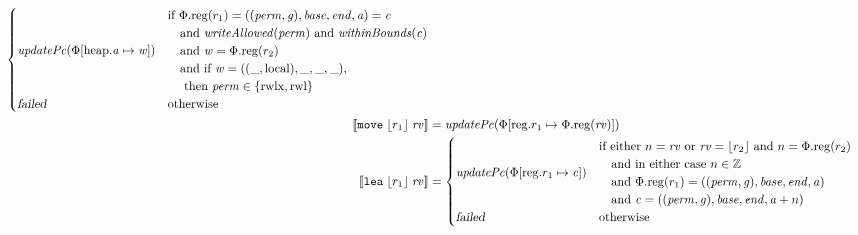 \documentclass{article}
\newcommand{\update}[2]{[#1 \mapsto #2]}
\newcommand{\sem}[1]{\left\llbracket #1 \right\rrbracket}
\newcommand{\var}[1]{\mathit{#1}}
\newcommand{\rv}{\var{rv}}
\newcommand{\gl}{\var{g}}
\newcommand{\addr}{\var{a}}
\newcommand{\start}{\var{base}}
\newcommand{\addrend}{\var{end}}
\newcommand{\perm}{\var{perm}}
\newcommand{\stdcap}[1][(\perm,\gl)]{\left(#1,\start,\addrend,\addr \right)}
\newcommand{\plainproj}[1]{\mathrm{#1}}
\newcommand{\memreg}[1][\Phi]{#1.\plainproj{reg}}
\newcommand{\updateHeap}[3][\Phi]{#1\update{\plainproj{heap}.#2}{#3}}
\newcommand{\updateReg}[3][\Phi]{#1\update{\plainproj{reg}.#2}{#3}}
\newcommand{\failed}{\textsl{failed}}
\newcommand{\plainfun}[2]{
  \ifthenelse{\equal{#2}{}}
             {\mathit{#1}}
             {\mathit{#1}(#2)}
}
\newcommand{\writeAllowed}[1]{\plainfun{writeAllowed}{#1}}
\newcommand{\withinBounds}[1]{\plainfun{withinBounds}{#1}}
\newcommand{\stdUpdatePc}[1]{\plainfun{updatePc}{#1}}
\newcommand{\ints}{\mathbb{Z}}
\newcommand{\refreg}[1]{\lfloor #1 \rfloor}
\newcommand{\zinstr}[1]{\mathtt{#1}}
\newcommand{\twoinstr}[3]{\zinstr{#1} \; #2 \; #3}
\newcommand{\move}[2]{\twoinstr{move}{#1}{#2}}
\newcommand{\lea}[2]{\twoinstr{lea}{#1}{#2}}
\newcommand{\plainperm}[1]{\mathrm{#1}}
\newcommand{\readwritel}{\plainperm{rwl}}
\newcommand{\rwlx}{\plainperm{rwlx}}
\newcommand{\local}{\plainperm{local}}
\begin{document}
\begin{align*}
\begin{cases}
                                               \stdUpdatePc{\updateHeap{\addr}{\var{w}}} &
                                               \arraycolsep=0pt
                                               \begin{array}{l}
                                                 \text{if }\memreg(r_1) = \stdcap = \var{c} \\
                                                 \quad\text{and }\writeAllowed{\perm} \text{ and } \withinBounds{\var{c}} \\
                                                 \quad\text{and }\var{w} = \memreg(r_2)\\
                                                 \quad\text{and if } \var{w} = ((\_,\local),\_,\_,\_) \text{,} \\
                                                 \quad\text{ then } \perm \in \{\rwlx,\readwritel \}
                                               \end{array}\\
                                               \failed & \text{otherwise }
                                             \end{cases}\\
 \sem{\move{\refreg{r_1}}{\rv}}            & = \stdUpdatePc{\updateReg{r_1}{\memreg(\rv)}}
\\
  \sem{\lea{\refreg{r_1}}{\rv}}            & =
                                             \begin{cases}
                                               \stdUpdatePc{\updateReg{r_1}{\var{c}}} &
                                                 \arraycolsep=0pt
                                                 \begin{array}{l}
                                                   \text{if either $n = \rv$ or $\rv = \refreg{r_2}$ and $n = \memreg(r_2)$} \\
                                                   \quad\text{and in either case $n \in \ints $} \\
                                                   \quad\text{and $\memreg(r_1) = \stdcap$}\\
                                                   \quad\text{and $\var{c} = ((\perm,\gl),\start,\addrend,\addr + n)$}
                                                 \end{array}\\
                                               \failed               & \text{otherwise}

\end{cases}
\end{align*}
\end{document}
